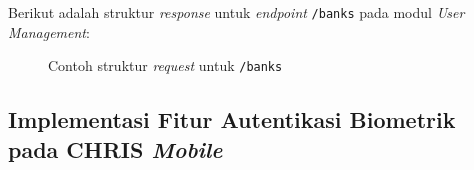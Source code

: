 Berikut adalah struktur \textit{response} untuk \textit{endpoint} \texttt{/banks} pada modul \textit{User Management}:
\begin{figure}
    \centering
    \caption{Contoh struktur \textit{request} untuk \texttt{/banks}}
    \label{fig:request_banks}
\end{figure}



\subsection{Implementasi Fitur Autentikasi Biometrik pada CHRIS \textit{Mobile}}

